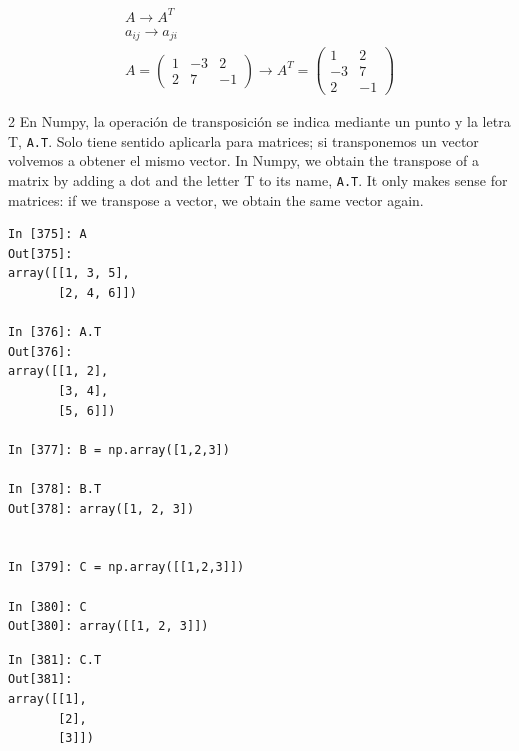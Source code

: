\begin{gather*}
A \rightarrow  A^T\\
a_{ij} \rightarrow  a_{ji}\\
A=
\begin{pmatrix}
1& -3& 2 \\
2& 7& -1
\end{pmatrix}  \rightarrow 
A^T=
\begin{pmatrix}
1& 2 \\
-3& 7\\
2 & -1
\end{pmatrix}
\end{gather*}

\begin{paracol}{2}
En Numpy, la operación de transposición se indica mediante un punto y la letra T, \texttt{A.T}. Solo tiene sentido aplicarla para matrices; si transponemos un vector volvemos a obtener el mismo vector.
\switchcolumn
In Numpy, we obtain the transpose of a matrix by adding a dot and the letter T to its name, \texttt{A.T}. It only makes sense for matrices: if we transpose a vector, we obtain the same vector again.
\end{paracol}

\begin{center}
    \begin{minipage}{0.5\textwidth}
        \begin{verbatim}
In [375]: A
Out[375]: 
array([[1, 3, 5],
       [2, 4, 6]])

In [376]: A.T
Out[376]: 
array([[1, 2],
       [3, 4],
       [5, 6]])

In [377]: B = np.array([1,2,3]) 

In [378]: B.T
Out[378]: array([1, 2, 3])


In [379]: C = np.array([[1,2,3]])

In [380]: C
Out[380]: array([[1, 2, 3]])
        \end{verbatim}
    \end{minipage}
\end{center}
\begin{center}
    \begin{minipage}{0.5\textwidth}
        \begin{verbatim}
In [381]: C.T
Out[381]: 
array([[1],
       [2],
       [3]])
        \end{verbatim}
    \end{minipage}
\end{center}

